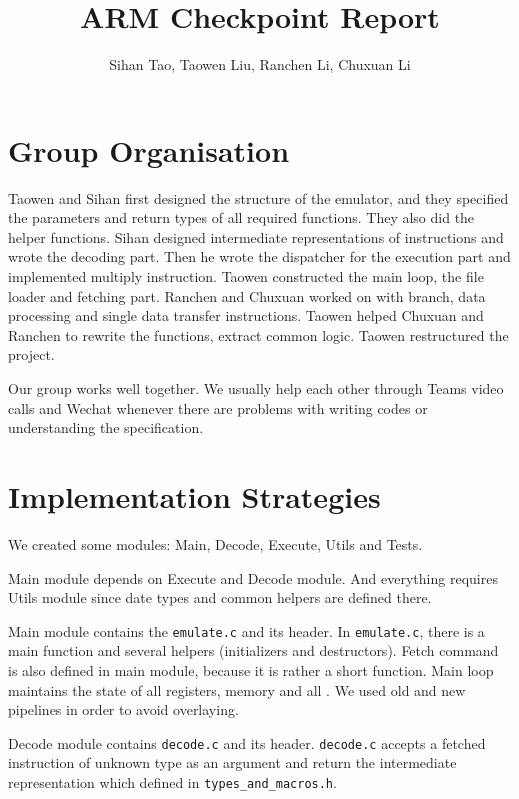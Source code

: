 \documentclass[10pt]{article}
\begin{document}
	
	\title{ARM Checkpoint Report}
	\author{Sihan Tao, Taowen Liu, Ranchen Li, Chuxuan Li}
	
	\maketitle
	
	\section{Group Organisation}
	
	Taowen and Sihan first designed the structure of the emulator, and they specified the parameters and return types of all required functions. They also did the helper functions. Sihan designed intermediate representations of instructions and wrote the decoding part. Then he wrote the dispatcher for the execution part and implemented multiply instruction. Taowen constructed the main loop, the file loader and fetching part. Ranchen and Chuxuan worked on with branch, data processing and single data transfer instructions. Taowen helped Chuxuan and Ranchen to rewrite the functions, extract common logic. Taowen restructured the project.
	
	Our group works well together. We usually help each other through Teams video calls and Wechat whenever there are problems with writing codes or understanding the specification.
	
	\section{Implementation Strategies}
	
	We created some modules: Main, Decode, Execute, Utils and Tests.
	
	Main module depends on Execute and Decode module. And everything requires Utils module since date types and common helpers are defined there.
	
	Main module contains the \texttt{emulate.c} and its header. In \texttt{emulate.c}, there is a main function and several helpers (initializers and destructors). Fetch command is also defined in main module, because it is rather a short function. Main loop maintains the state of all registers, memory and all . We used old and new pipelines in order to avoid overlaying.
	
	Decode module contains \texttt{decode.c} and its header. \texttt{decode.c} accepts a fetched instruction of unknown type as an argument and return the intermediate representation which defined in \texttt{types\_and\_macros.h}.
	
\end{document}
